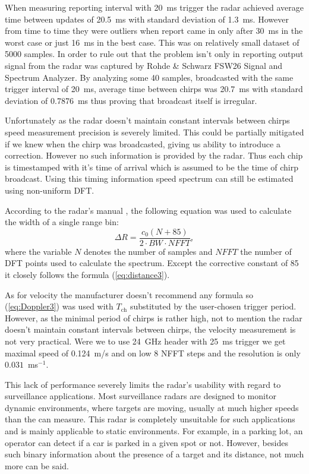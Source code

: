 When measuring reporting interval with 20~ms trigger the radar achieved average time between updates of 20.5~ms with standard deviation of 1.3~ms.
However from time to time they were outliers when report came in only after 30~ms in the worst case or just 16~ms in the best case.
This was on relatively small dataset of 5000 samples.
In order to rule out that the problem isn't only in reporting output signal from the radar was captured by Rohde \& Schwarz FSW26 Signal and Spectrum Analyzer.
By analyzing some 40 samples, broadcasted with the same trigger interval of 20~ms, average time between chirps was 20.7~ms with standard deviation of 0.7876~ms thus proving that broadcast itself is irregular.

Unfortunately as the radar doesn't maintain constant intervals between chirps speed measurement precision is severely limited.
This could be partially mitigated if we knew when the chirp was broadcasted, giving us ability to introduce a correction.
However no such information is provided by the radar.
Thus each chip is timestamped with it's time of arrival which is assumed to be the time of chirp broadcast.
Using this timing information speed spectrum can still be estimated using non-uniform DFT.

According to the radar's manual \cite{sidarPRO}, the following equation was used to calculate the width of a single range bin:
\begin{equation}
  \Delta R = \frac{c_0 (N+85)}{2\cdot BW\cdot NFFT},
  \label{eq:rangeBin}
\end{equation}
where the variable $N$ denotes the number of samples and $NFFT$ the number of DFT points used to calculate the spectrum.
Except the corrective constant of 85 it closely follows the formula (\ref{eq:distance3}).

As for velocity the manufacturer doesn't recommend any formula so (\ref{eq:Doppler3}) was used with $T_\mathrm{ch}$ substituted by the user-chosen trigger period.
However, as the minimal period of chirps is rather high, not to mention the radar doesn't maintain constant intervals between chirps, the velocity measurement is not very practical.
Were we to use 24~GHz header with 25~ms trigger we get maximal speed of 0.124~m/s and on low 8 NFFT steps and the resolution is only $0.031$~ms$^{-1}$.

This lack of performance severely limits the radar's usability with regard to surveillance applications.
Most surveillance radars are designed to monitor dynamic environments, where targets are moving, usually at much higher speeds than the \sidar can measure.
This radar is completely unsuitable for such applications and is mainly applicable to static environments.
For example, in a parking lot, an operator can detect if a car is parked in a given spot or not.
However, besides such binary information about the presence of a target and its distance, not much more can be said.


